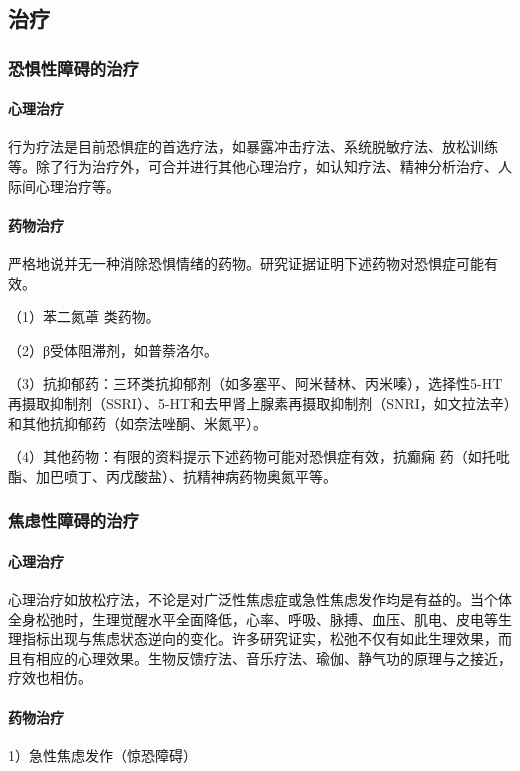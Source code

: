 \subsection{治疗}

\subsubsection{恐惧性障碍的治疗}
\paragraph{心理治疗}

行为疗法是目前恐惧症的首选疗法，如暴露冲击疗法、系统脱敏疗法、放松训练等。除了行为治疗外，可合并进行其他心理治疗，如认知疗法、精神分析治疗、人际间心理治疗等。
\paragraph{药物治疗}

严格地说并无一种消除恐惧情绪的药物。研究证据证明下述药物对恐惧症可能有效。

（1）苯二氮䓬 类药物。

（2）β受体阻滞剂，如普萘洛尔。

（3）抗抑郁药：三环类抗抑郁剂（如多塞平、阿米替林、丙米嗪），选择性5-HT再摄取抑制剂（SSRI）、5-HT和去甲肾上腺素再摄取抑制剂（SNRI，如文拉法辛）和其他抗抑郁药（如奈法唑酮、米氮平）。

（4）其他药物：有限的资料提示下述药物可能对恐惧症有效，抗癫痫
药（如托吡酯、加巴喷丁、丙戊酸盐）、抗精神病药物奥氮平等。

\subsubsection{焦虑性障碍的治疗}
\paragraph{心理治疗}

心理治疗如放松疗法，不论是对广泛性焦虑症或急性焦虑发作均是有益的。当个体全身松弛时，生理觉醒水平全面降低，心率、呼吸、脉搏、血压、肌电、皮电等生理指标出现与焦虑状态逆向的变化。许多研究证实，松弛不仅有如此生理效果，而且有相应的心理效果。生物反馈疗法、音乐疗法、瑜伽、静气功的原理与之接近，疗效也相仿。
\paragraph{药物治疗}

1）急性焦虑发作（惊恐障碍）

